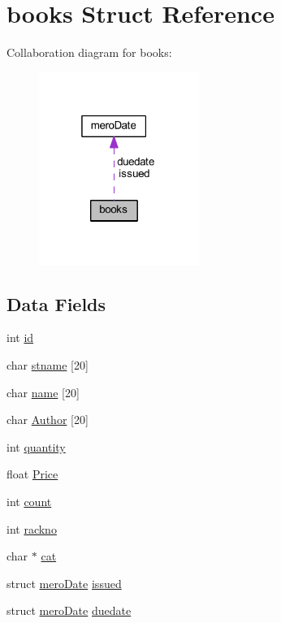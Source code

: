 \hypertarget{structbooks}{\section{books Struct Reference}
\label{structbooks}
}


Collaboration diagram for books\+:\nopagebreak
\begin{figure}[H]
\begin{center}
\leavevmode
\includegraphics[width=148pt]{structbooks__coll__graph}
\end{center}
\end{figure}
\subsection*{Data Fields}
\begin{DoxyCompactItemize}
\item 
int \hyperlink{structbooks_a7441ef0865bcb3db9b8064dd7375c1ea}{id}
\item 
char \hyperlink{structbooks_adad902f541b3380ae89b050332193778}{stname} \mbox{[}20\mbox{]}
\item 
char \hyperlink{structbooks_a399913f362e281ef4dc15e393d33642b}{name} \mbox{[}20\mbox{]}
\item 
char \hyperlink{structbooks_a90759739feb83da85334478c78abe027}{Author} \mbox{[}20\mbox{]}
\item 
int \hyperlink{structbooks_ae6969e17e31c17a28dbf801f91acacfb}{quantity}
\item 
float \hyperlink{structbooks_af97474bf51c3b45301f3e01271baef3b}{Price}
\item 
int \hyperlink{structbooks_ad43c3812e6d13e0518d9f8b8f463ffcf}{count}
\item 
int \hyperlink{structbooks_afea1bb3151c33a1c78ae6bd79f8fa754}{rackno}
\item 
char $\ast$ \hyperlink{structbooks_a48e71daf5632ed64d2ae931391d43854}{cat}
\item 
struct \hyperlink{structmero_date}{mero\+Date} \hyperlink{structbooks_a722d044aa88e5133b38d6ac9fb58127e}{issued}
\item 
struct \hyperlink{structmero_date}{mero\+Date} \hyperlink{structbooks_adea367e45aa32968b0c8a5fd72781e22}{duedate}
\end{DoxyCompactItemize}


